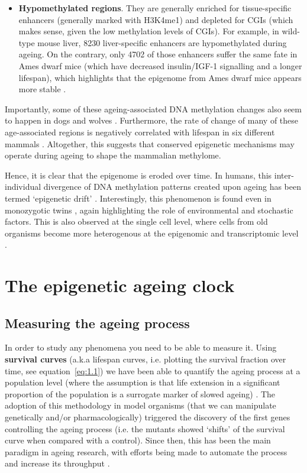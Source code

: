 \begin{itemize}
	\item \textbf{Hypomethylated regions}. They are generally enriched for tissue-specific enhancers (generally marked with H3K4me1) and depleted for \acrshort{CGI}s (which makes sense, given the low methylation levels of CGIs). For example, in wild-type mouse liver, 8230 liver-specific enhancers are hypomethylated during ageing. On the contrary, only 4702 of those enhancers suffer the same fate in Ames dwarf mice (which have decreased insulin/IGF-1 signalling and a longer lifespan), which highlights that the epigenome from Ames dwarf mice appears more stable \cite{Cole2017}.     
	
\end{itemize} 

Importantly, some of these ageing-associated DNA methylation changes also seem to happen in dogs and wolves \cite{Thompson2017}. Furthermore, the rate of change of many of these age-associated regions is negatively correlated with lifespan in six different mammals \cite{Lowe2018}. Altogether, this suggests that conserved epigenetic mechanisms may operate during ageing to shape the mammalian methylome.

\bigskip

Hence, it is clear that the epigenome is eroded over time. In humans, this inter-individual divergence of DNA methylation patterns created upon ageing has been termed `epigenetic drift' \cite{West2013}. Interestingly, this phenomenon is found even in monozygotic twins \cite{Fraga2005,Talens2012}, again highlighting the role of environmental and stochastic factors. This is also observed at the single cell level, where cells from old organisms become more heterogenous at the epigenomic and transcriptomic level \cite{Hernando-Herraez2018,Martinez-Jimenez2017}.

\bigskip

\section{The epigenetic ageing clock}

\subsection{Measuring the ageing process}

\smallskip

In order to study any phenomena you need to be able to measure it. Using \textbf{survival curves} (a.k.a lifespan curves, i.e. plotting the survival fraction over time, see equation~\ref{eq:1.1}) we have been able to quantify the ageing process at a population level (where the assumption is that life extension in a significant proportion of the population is a surrogate marker of slowed ageing) \cite{Johnson2013}. The adoption of this methodology in model organisms (that we can manipulate genetically and/or pharmacologically) triggered the discovery of the first genes controlling the ageing process (i.e. the mutants showed `shifts' of the survival curve when compared with a control). Since then, this has been the main paradigm in ageing research, with efforts being made to automate the process and increase its throughput \cite{Stroustrup2013}.

